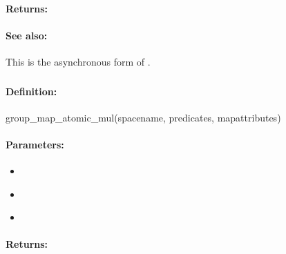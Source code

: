 \paragraph{Returns:}


\paragraph{See also:}  This is the asynchronous form of .

\pagebreak
\subsubsection{}
\label{api:ruby:group_map_atomic_mul}


\paragraph{Definition:}
\begin{rubycode}
group_map_atomic_mul(spacename, predicates, mapattributes)
\end{rubycode}

\paragraph{Parameters:}
\begin{itemize}[noitemsep]
\item {}\\

\item {}\\

\item {}\\

\end{itemize}

\paragraph{Returns:}


\pagebreak
\subsubsection{}
\label{api:ruby:async_group_map_atomic_mul}


